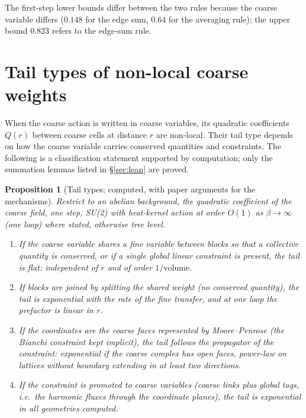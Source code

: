 \documentclass[11pt,a4paper]{article}
\newtheorem{proposition}[theorem]{Proposition}
\theoremstyle{definition}
\theoremstyle{remark}
\begin{document}
The first-step lower bounds differ between the two rules because the coarse variable differs ($0.148$ for the edge sum, $0.64$ for the averaging rule); the upper bound $0.823$ refers to the edge-sum rule.

\section{Tail types of non-local coarse weights}\label{sec:tails}

When the coarse action is written in coarse variables, its quadratic coefficients $Q(r)$ between coarse cells at distance $r$ are non-local. Their tail type depends on how the coarse variable carries conserved quantities and constraints. The following is a classification statement supported by computation; only the summation lemmas listed in \S\ref{sec:lean} are proved.

\begin{proposition}[Tail types; computed, with paper arguments for the mechanisms]\label{prop:tails}
Restrict to an abelian background, the quadratic coefficient of the coarse field, one step, SU(2) with heat-kernel action at order $O(1)$ as $\beta\to\infty$ (one loop) where stated, otherwise tree level.
\begin{enumerate}[label=(\arabic*)]
\item If the coarse variable shares a fine variable between blocks so that a collective quantity is conserved, or if a single global linear constraint is present, the tail is \emph{flat}: independent of $r$ and of order $1/\text{volume}$.
\item If blocks are joined by splitting the shared weight (no conserved quantity), the tail is \emph{exponential} with the rate of the fine transfer, and at one loop the prefactor is linear in $r$.
\item If the coordinates are the coarse faces represented by Moore--Penrose (the Bianchi constraint kept implicit), the tail follows the propagator of the constraint: exponential if the coarse complex has open faces, \emph{power-law} on lattices without boundary extending in at least two directions.
\item If the constraint is promoted to coarse variables (coarse links plus global tags, i.e.\ the harmonic fluxes through the coordinate planes), the tail is exponential in all geometries computed.
\end{enumerate}
\end{proposition}
\end{document}
